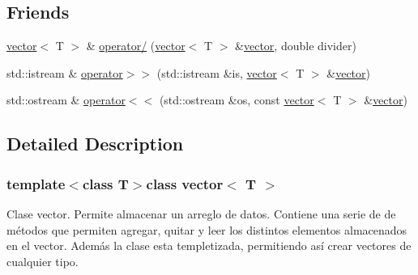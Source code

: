 \subsection*{Friends}
\begin{DoxyCompactItemize}
\item 
\hyperlink{classvector}{vector}$<$ T $>$ \& \hyperlink{classvector_a081ad6fb04eed6e06c7bb00de79abb1b}{operator/} (\hyperlink{classvector}{vector}$<$ T $>$ \&\hyperlink{classvector}{vector}, double divider)
\item 
std\-::istream \& \hyperlink{classvector_a0a88edbf6d2d54cb1687d637c77b9769}{operator$>$$>$} (std\-::istream \&is, \hyperlink{classvector}{vector}$<$ T $>$ \&\hyperlink{classvector}{vector})
\item 
std\-::ostream \& \hyperlink{classvector_a09118ab52363911a521f38dc53e8ecc3}{operator$<$$<$} (std\-::ostream \&os, const \hyperlink{classvector}{vector}$<$ T $>$ \&\hyperlink{classvector}{vector})
\end{DoxyCompactItemize}


\subsection{Detailed Description}
\subsubsection*{template$<$class T$>$class vector$<$ T $>$}

Clase vector. Permite almacenar un arreglo de datos. Contiene una serie de de métodos que permiten agregar, quitar y leer los distintos elementos almacenados en el vector. Además la clase esta templetizada, permitiendo así crear vectores de cualquier tipo. 

